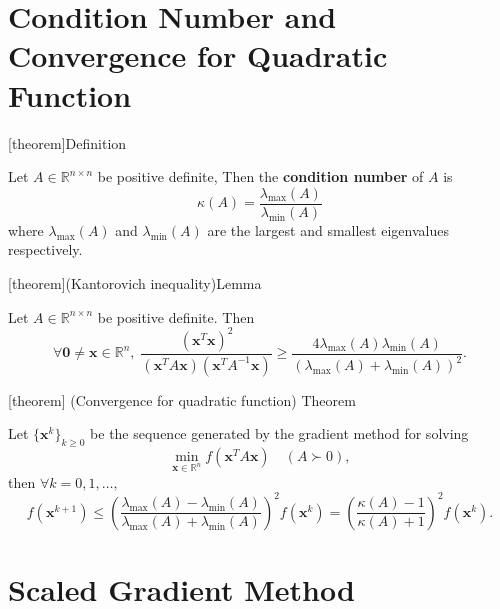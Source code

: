 \documentclass[12pt]{report}
\theoremstyle{definition}
\begin{document}
\section{Condition Number and Convergence for Quadratic Function}

[theorem]{Definition}
\begin{condition number}
    Let $A\in\mathbb{R}^{n\times n}$ be positive definite, Then the
    \textbf{condition number} of $A$ is
    \[
        \kappa(A)=\frac{\lambda_\text{max}(A)}{\lambda_\text{min}(A)}
    \]
    where $\lambda_\text{max}(A)$ and $\lambda_\text{min}(A)$ are the largest
    and smallest eigenvalues respectively.
\end{condition number}

[theorem]{(Kantorovich inequality)Lemma}
\begin{kantorovich inequality}
    Let $A\in\mathbb{R}^{n\times n}$ be positive definite. Then
    \[
        \forall \mathbf{0}\neq\mathbf{x}\in\mathbb{R}^{n},\;
        \frac{{(\mathbf{x}^T\mathbf{x})}^{2}}{(\mathbf{x}^TA\mathbf{x})(\mathbf{x}^TA^{-1}\mathbf{x})}
        \ge\frac{4\lambda_\text{max}(A)\lambda_\text{min}(A)}{{(\lambda_\text{max}(A)+\lambda_\text{min}(A))}^{2}}.
    \]
\end{kantorovich inequality}

[theorem]
{(Convergence for quadratic function) Theorem}
\begin{gradient method for minimizing quadratic function}
    Let ${\{\mathbf{x}^k\}}_{k\ge 0}$ be the sequence generated by the gradient
    method for solving 
    \[
        \underset{\mathbf{x}\in\mathbb{R}^{n}}{\min}f(\mathbf{x}^TA\mathbf{x})\quad
        (A\succ 0),
    \]
    then $\forall k=0,1,\ldots,$
    \[
        f(\mathbf{x}^{k+1})\le{\left(\frac{\lambda_\text{max}(A)-\lambda_\text{min}(A)}
        {\lambda_\text{max}(A)+\lambda_\text{min}(A)}\right)}^{2}f(\mathbf{x}^k)
        ={\left(\frac{\kappa(A)-1}{\kappa(A)+1}\right)}^{2}f(\mathbf{x}^k).
    \]
\end{gradient method for minimizing quadratic function}

\section{Scaled Gradient Method}
\end{document}
